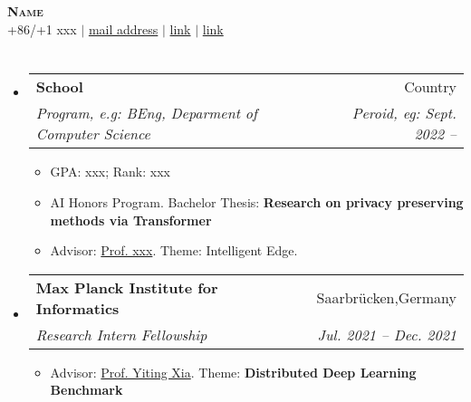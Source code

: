 \documentclass[letterpaper,12pt]{article}
\makeatletter
\newcommand{\resumeSubheading}[4]{
  \vspace{-1pt}\item
    \begin{tabular*}{0.97\textwidth}[t]{l@{\extracolsep{\fill}}r}
      \textbf{#1} & #2 \\
      \textit{\small#3} & \textit{\small #4} \\
    \end{tabular*}\vspace{-8pt}
}
\newcommand{\resumeSubHeadingListStart}{\begin{itemize}[leftmargin=0.15in, label={}]}
\newcommand{\resumeSubHeadingListEnd}{\end{itemize}}
\makeatother
\begin{document}

\begin{center}
    \textbf{\color{LightBlue} \Huge \scshape Name} \\ \vspace{1pt}
    \small +86/+1 xxx  $|$ \href{mail address}{mail address} 
    $|$
    \href{github address or linkedin address}{link} $|$ \href{personal web page if you have}{link}
\end{center}

\vspace{-10pt}
{\color{DarkBlue}\section {}}
\resumeSubHeadingListStart
	\resumeSubheading
		{School}{Country}{Program, e.g: BEng, Deparment of Computer Science}{Peroid, eg: Sept. 2022 --}
    	\begin{itemize}
   		\item GPA: xxx; Rank: xxx
    	\item AI Honors Program. Bachelor Thesis: \textbf{Research on privacy preserving methods via Transformer} \vspace{-2pt}
  		\item Advisor: \href{link}{Prof. xxx}. Theme: Intelligent Edge. \vspace{-2pt}
   		\vspace{-7pt}
  		\end{itemize}
\resumeSubHeadingListEnd
  \vspace{-7.5pt}
\resumeSubHeadingListStart
	\resumeSubheading
    {Max Planck Institute for Informatics}{Saarbrücken,Germany}
    {Research Intern Fellowship}{Jul. 2021 -- Dec. 2021}
     \begin{itemize}
  		\item Advisor: \href{https://sites.google.com/view/yitingxia/}{Prof. Yiting Xia}. Theme: \textbf{Distributed Deep Learning Benchmark}  \vspace{-7pt}
  	 \end{itemize}
\resumeSubHeadingListEnd
\end{document}
